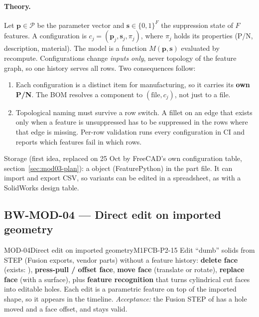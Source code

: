 \paragraph{Theory.} Let $\mathbf p\in\mathcal P$ be the parameter vector and $\mathbf s\in\{0,1\}^{F}$
the suppression state of $F$ features. A configuration is $c_j=(\mathbf p_j,\mathbf s_j,\pi_j)$, where
$\pi_j$ holds its properties (P/N, description, material). The model is a function $M(\mathbf p,\mathbf s)$
evaluated by recompute. Configurations change \emph{inputs only}, never topology of the feature graph, so
one history serves all rows. Two consequences follow:
\begin{enumerate}
  \item Each configuration is a distinct item for manufacturing, so it carries its \textbf{own P/N}. The BOM
        resolves a component to $(\text{file},c_j)$, not just to a file.
  \item Topological naming must survive a row switch. A fillet on an edge that exists only when a feature is
        unsuppressed has to be suppressed in the rows where that edge is missing. Per-row validation runs
        every configuration in CI and reports which features fail in which rows.
\end{enumerate}
Storage (first idea, replaced on 25 Oct by FreeCAD's own configuration table, section~\ref{sec:mod03-plan}):
a  object (FeaturePython) in the part file. It can import and
export CSV, so variants can be edited in a spreadsheet, as with a SolidWorks design table.



\subsection{BW-MOD-04 --- Direct edit on imported geometry}

\begin{epic}{MOD-04}{Direct edit on imported geometry}{M1}{\stTodo}{FCB-P2-15}
Edit ``dumb'' solids from STEP (Fusion exports, vendor parts) without a feature history:
\textbf{delete face} (exists: ), \textbf{press-pull / offset face},
\textbf{move face} (translate or rotate), \textbf{replace face} (with a surface), plus \textbf{feature
recognition} that turns cylindrical cut faces into editable holes. Each edit is a parametric feature on top
of the imported shape, so it appears in the timeline.
\emph{Acceptance:} the Fusion STEP of  has a hole moved and a face offset, and stays valid.
\end{epic}

